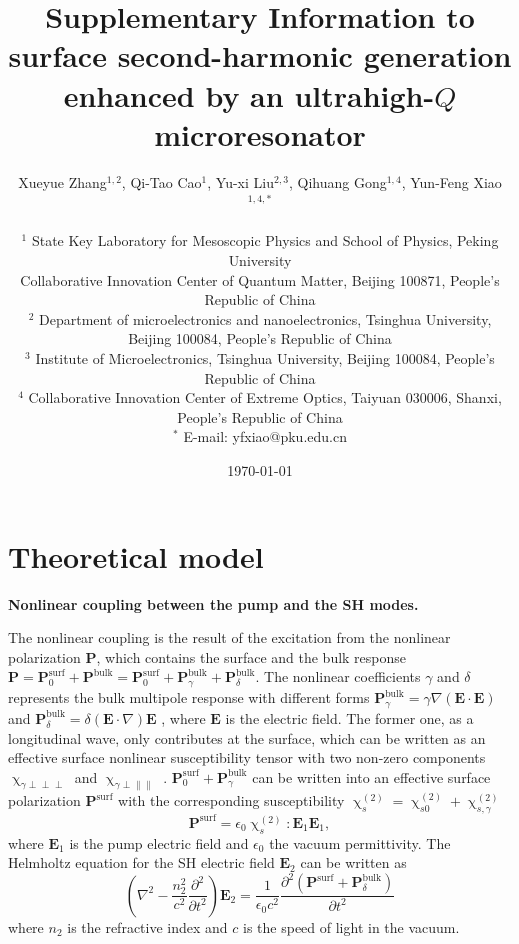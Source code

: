 \documentclass[a4paper,8pt,hyperref, aps, prl]{article}
\title{\bfseries \Large 
Supplementary Information to surface second-harmonic generation enhanced by an ultrahigh-$Q$ microresonator
}
\author{\normalsize  Xueyue Zhang$^{1,2}$, Qi-Tao Cao$^{1}$, Yu-xi Liu$^{2,3}$, Qihuang Gong$^{1,4}$, Yun-Feng Xiao$^{1,4,*}$ \\
  \\
\normalsize $^1$ State Key Laboratory for Mesoscopic Physics and School of Physics, Peking University \\
\normalsize Collaborative Innovation Center of Quantum Matter, Beijing 100871, People's Republic of China \\
\normalsize $^2$ Department of microelectronics and nanoelectronics, Tsinghua University, Beijing 100084, People’s Republic of China \\
\normalsize $^3$ Institute of Microelectronics, Tsinghua University, Beijing 100084, People’s Republic of China \\
\normalsize $^4$ Collaborative Innovation Center of Extreme Optics, Taiyuan 030006, Shanxi, People’s Republic of China \\
\normalsize $^*$ E-mail: yfxiao@pku.edu.cn
}
\date{\normalsize \today}
\begin{document}
\maketitle

\section{Theoretical model}

\textbf{Nonlinear coupling between the pump and the SH modes. }

The nonlinear coupling is the result of the excitation from the nonlinear polarization $\mathbf{P}$, which contains the surface and the bulk response $\mathbf{P} = \mathbf{P}^{\mathrm{surf}}_0+\mathbf{P}^{\mathrm{bulk}} = \mathbf{P}^{\mathrm{surf}}_0+\mathbf{P}^{\mathrm{bulk}}_\gamma+\mathbf{P}^{\mathrm{bulk}}_\delta$. 
The nonlinear coefficients $\gamma$ and $\delta$ represents the bulk multipole response with different forms $\mathbf{P}^{\mathrm{bulk}}_\gamma =  \gamma\nabla(\mathbf{E}\cdot\mathbf{E})$ and $\mathbf{P}^{\mathrm{bulk}}_\delta = \delta(\mathbf{E}\cdot\nabla)\mathbf{E}$ \cite{bloembergen1968optical}, where $\mathbf{E}$ is the electric field. 
The former one, as a longitudinal wave, only contributes at the surface, which can be written as an effective surface nonlinear susceptibility tensor with two non-zero components $\upchi_{\gamma \perp \perp \perp}$ and $\upchi_{\gamma \perp \parallel \parallel}$ \cite{heinz1991second}. 
$\mathbf{P}^{\mathrm{surf}}_0+\mathbf{P}^{\mathrm{bulk}}_\gamma$ can be written into an effective surface polarization $\mathbf{P}^{\mathrm{surf}}$ with the corresponding susceptibility $\upchi^{(2)}_s = \upchi^{(2)}_{s0}+\upchi^{(2)}_{s,\gamma}$
\label{eq:Pdef}
\begin{equation}
\mathbf{P}^{\mathrm{surf}} = \epsilon_0\upchi^{(2)}_s:\mathbf{E}_1\mathbf{E}_1,
\end{equation}
where $\mathbf{E}_1$ is the pump electric field and $\epsilon_0$ the vacuum permittivity. The Helmholtz equation for the SH electric field $\mathbf{E}_2$ can be written as 
\begin{equation}
(\nabla^2 -\frac{n_2^2}{c^2}\frac{\partial^2}{\partial t^2})\mathbf{E}_{2} = \frac{1}{\epsilon_0c^2}\frac{\partial^2(\mathbf{P}^{\mathrm{surf}}+\mathbf{P}^{\mathrm{bulk}}_\delta)}{\partial t^2}
\label{eq:Helm}
\end{equation}
where $n_2$ is the refractive index and $c$ is the speed of light in the vacuum. 
\end{document}

